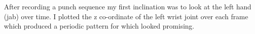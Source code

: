 \begin{figure}[t!]
\centering
\begin{minipage}{6.0cm}
    \centering
    \label{fig:1}
\end{minipage}
\begin{minipage}{6.0cm}
    \centering
    \label{fig:2}
\end{minipage}
\end{figure}

After recording a punch sequence my first inclination was to look at the left hand (jab) over time. I plotted the z co-ordinate of the left wrist joint over each frame which produced a periodic pattern for which looked promising.


